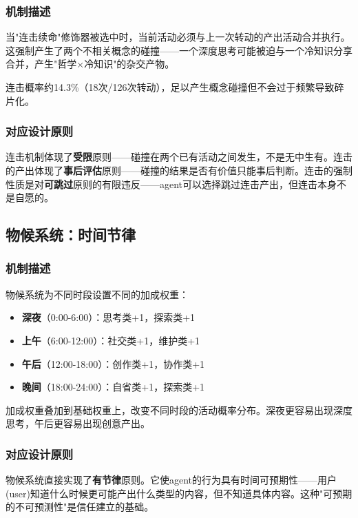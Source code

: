 \documentclass[12pt,a4paper]{ctexart}
\begin{document}
\subsubsection{机制描述}

当"连击续命"修饰器被选中时，当前活动必须与上一次转动的产出活动合并执行。这强制产生了两个不相关概念的碰撞——一个深度思考可能被迫与一个冷知识分享合并，产生"哲学×冷知识"的杂交产物。

连击概率约14.3\%（18次/126次转动），足以产生概念碰撞但不会过于频繁导致碎片化。

\subsubsection{对应设计原则}

连击机制体现了\textbf{受限}原则——碰撞在两个已有活动之间发生，不是无中生有。连击的产出体现了\textbf{事后评估}原则——碰撞的结果是否有价值只能事后判断。连击的强制性质是对\textbf{可跳过}原则的有限违反——agent可以选择跳过连击产出，但连击本身不是自愿的。

\subsection{物候系统：时间节律}

\subsubsection{机制描述}

物候系统为不同时段设置不同的加成权重：

\begin{itemize}[nosep]
\item \textbf{深夜}（0:00-6:00）：思考类+1，探索类+1
\item \textbf{上午}（6:00-12:00）：社交类+1，维护类+1
\item \textbf{午后}（12:00-18:00）：创作类+1，协作类+1
\item \textbf{晚间}（18:00-24:00）：自省类+1，探索类+1
\end{itemize}

加成权重叠加到基础权重上，改变不同时段的活动概率分布。深夜更容易出现深度思考，午后更容易出现创意产出。

\subsubsection{对应设计原则}

物候系统直接实现了\textbf{有节律}原则。它使agent的行为具有时间可预期性——用户(user)知道什么时候更可能产出什么类型的内容，但不知道具体内容。这种"可预期的不可预测性"是信任建立的基础。
\end{document}
